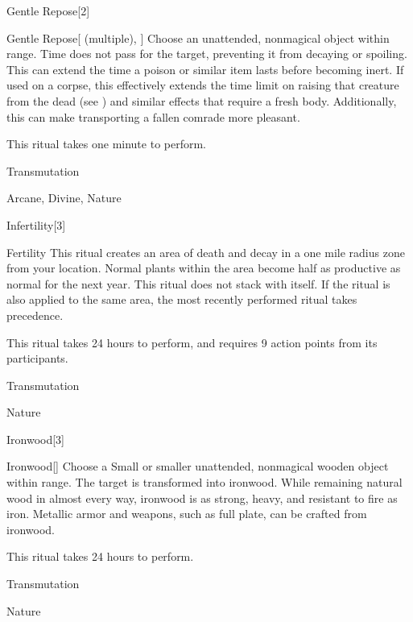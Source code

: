 \begin{spellsection}{Gentle Repose}[2]


\begin{ability}{Gentle Repose}[ (multiple), ]
Choose an unattended, nonmagical object within \rngclose range.
Time does not pass for the target, preventing it from decaying or spoiling.
This can extend the time a poison or similar item lasts before becoming inert.
If used on a corpse, this effectively extends the time limit on raising that creature from the dead (see ) and similar effects that require a fresh body.
Additionally, this can make transporting a fallen comrade more pleasant.

This ritual takes one minute to perform.
\end{ability}




 Transmutation

 Arcane, Divine, Nature
\end{spellsection}


\begin{spellsection}{Infertility}[3]


\begin{ability}{Fertility}
This ritual creates an area of death and decay in a one mile radius zone from your location.
Normal plants within the area become half as productive as normal for the next year.
This ritual does not stack with itself.
If the  ritual is also applied to the same area, the most recently performed ritual takes precedence.

This ritual takes 24 hours to perform, and requires 9 action points from its participants.
\end{ability}




 Transmutation

 Nature
\end{spellsection}


\begin{spellsection}{Ironwood}[3]


\begin{ability}{Ironwood}[]
Choose a Small or smaller unattended, nonmagical wooden object within \rngclose range.
The target is transformed into ironwood.
While remaining natural wood in almost every way, ironwood is as strong, heavy, and resistant to fire as iron.
Metallic armor and weapons, such as full plate, can be crafted from ironwood.

This ritual takes 24 hours to perform.
\end{ability}




 Transmutation

 Nature
\end{spellsection}


